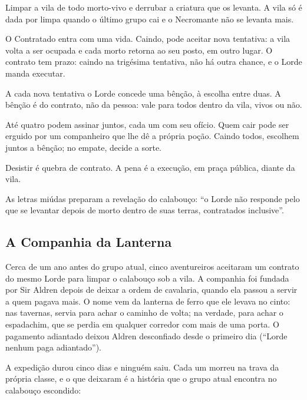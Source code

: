 \documentclass[11pt,a4paper]{article}
\begin{document}
\begin{description}[leftmargin=0pt]
    \item[I. Do objeto.] Limpar a vila de todo morto-vivo e derrubar a criatura que os levanta. A vila só é dada por limpa quando o último grupo cai e o Necromante não se levanta mais.
    \item[II. Da vida.] O Contratado entra com uma vida. Caindo, pode aceitar nova tentativa: a vila volta a ser ocupada e cada morto retorna ao seu posto, em outro lugar. O contrato tem prazo: caindo na trigésima tentativa, não há outra chance, e o Lorde manda executar.
    \item[III. Da bênção.] A cada nova tentativa o Lorde concede uma bênção, à escolha entre duas. A bênção é do contrato, não da pessoa: vale para todos dentro da vila, vivos ou não.
    \item[IV. Da companhia.] Até quatro podem assinar juntos, cada um com seu ofício. Quem cair pode ser erguido por um companheiro que lhe dê a própria poção. Caindo todos, escolhem juntos a bênção; no empate, decide a sorte.
    \item[V. Do abandono.] Desistir é quebra de contrato. A pena é a execução, em praça pública, diante da vila.
\end{description}

As letras miúdas preparam a revelação do calabouço: ``o Lorde não responde pelo que se levantar depois de morto dentro de suas terras, contratados inclusive''.

\subsection{A Companhia da Lanterna}

Cerca de um ano antes do grupo atual, cinco aventureiros aceitaram um contrato do mesmo Lorde para limpar o calabouço sob a vila. A companhia foi fundada por Sir Aldren depois de deixar a ordem de cavalaria, quando ela passou a servir a quem pagava mais. O nome vem da lanterna de ferro que ele levava no cinto: nas tavernas, servia para achar o caminho de volta; na verdade, para achar o espadachim, que se perdia em qualquer corredor com mais de uma porta. O pagamento adiantado deixou Aldren desconfiado desde o primeiro dia (``Lorde nenhum paga adiantado'').

A expedição durou cinco dias e ninguém saiu. Cada um morreu na trava da própria classe, e o que deixaram é a história que o grupo atual encontra no calabouço escondido:
\end{document}
